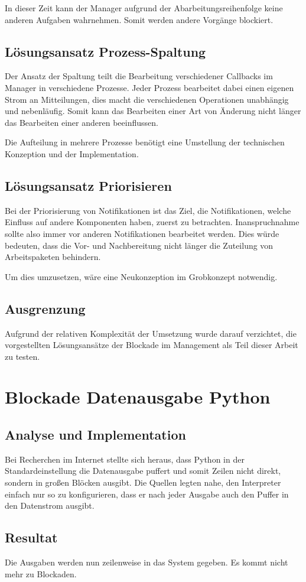 In dieser Zeit kann der Manager aufgrund der Abarbeitungsreihenfolge
keine anderen Aufgaben wahrnehmen.
Somit werden andere Vorgänge blockiert.

\subsection{Lösungsansatz Prozess-Spaltung}

Der Ansatz der Spaltung teilt die Bearbeitung verschiedener Callbacks im Manager
in verschiedene Prozesse. Jeder Prozess bearbeitet dabei einen eigenen Strom an Mitteilungen, dies macht die verschiedenen Operationen unabhängig und nebenläufig.
Somit kann das Bearbeiten einer Art von Änderung nicht länger das Bearbeiten einer anderen beeinflussen.

Die Aufteilung in mehrere Prozesse benötigt eine Umstellung der technischen Konzeption und der Implementation.

\subsection{Lösungsansatz Priorisieren}

Bei der Priorisierung von Notifikationen ist das Ziel,
die Notifikationen, welche Einfluss auf andere Komponenten haben, zuerst zu betrachten.
Inanspruchnahme sollte also immer vor anderen Notifikationen bearbeitet werden.
Dies würde bedeuten, dass die Vor- und Nachbereitung nicht länger die Zuteilung von Arbeitspaketen behindern.

Um dies umzusetzen, wäre eine Neukonzeption im Grobkonzept notwendig.


\subsection{Ausgrenzung}

Aufgrund der relativen Komplexität der Umsetzung
wurde darauf verzichtet, die vorgestellten Lösungsansätze der Blockade im Management
als Teil dieser Arbeit zu testen.

\section{Blockade Datenausgabe Python}
\label{cha:opt:block-py-io}

\subsection{Analyse und Implementation}

Bei Recherchen im Internet stellte sich heraus,
dass Python in der Standardeinstellung die Datenausgabe puffert und somit Zeilen nicht direkt,
sondern in großen Blöcken ausgibt.
Die Quellen legten nahe, den Interpreter einfach nur so zu konfigurieren,
dass er nach jeder Ausgabe auch den Puffer in den Datenstrom ausgibt.

\subsection{Resultat}

Die Ausgaben werden nun zeilenweise in das System gegeben.
Es kommt nicht mehr zu Blockaden.

